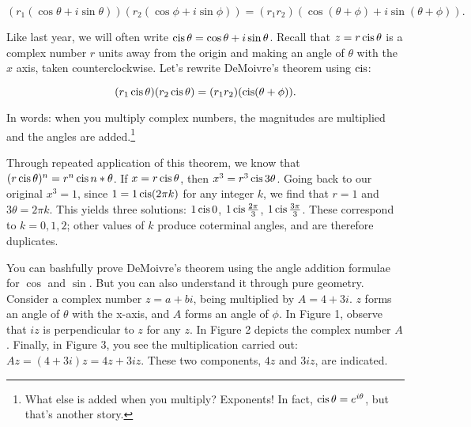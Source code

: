 \documentclass[../gatm.tex]{subfiles}
\begin{document}
$$(r_1 (\cos \theta + i \sin \theta)) (r_2 (\cos \phi + i \sin \phi)) = (r_1r_2) (\cos(\theta + \phi) + i \sin(\theta + \phi)).$$

\noindent Like last year, we will often write $\operatorname{cis} \theta = \cos \theta + i \sin \theta$. Recall that $z=r\operatorname{cis} \theta$ is a complex number $r$ units away from the origin and making an angle of $\theta$ with the $x$ axis, taken counterclockwise. Let’s rewrite DeMoivre’s theorem using $\operatorname{cis}$:

$$(r_1 \operatorname{cis} \theta)(r_2 \operatorname{cis} \theta) = (r_1r_2)(\operatorname{cis}(\theta + \phi)).$$

\noindent In words: when you multiply complex numbers, the magnitudes are multiplied and the angles are added.\footnote{What else is added when you multiply? Exponents! In fact, $\operatorname{cis} \theta = e^{i\theta}$, but that’s another story.}

Through repeated application of this theorem, we know that $(r \operatorname{cis} \theta) ^ n = r^n \operatorname{cis} n*\theta$. If $x = r \operatorname{cis} \theta$, then $x^3 = r^3 \operatorname{cis} 3\theta$. Going back to our original $x^3 = 1$, since $1 = 1 \operatorname{cis}(2\pi k)$ for any integer $k$, we find that $r = 1$ and $3\theta = 2\pi k$. This yields three solutions: $1 \operatorname{cis} 0$, $1 \operatorname{cis} \frac{2\pi}{3}$, $1 \operatorname{cis} \frac{3\pi}{3}$. These correspond to $k = 0, 1, 2$; other values of $k$ produce coterminal angles, and are therefore duplicates.

You can bashfully prove DeMoivre’s theorem using the angle addition formulae for $\cos$ and $\sin$. But you can also understand it through pure geometry. Consider a complex number $z = a + bi$, being multiplied by $A = 4 + 3i$. $z$ forms an angle of $\theta$ with the x-axis, and $A$ forms an angle of $\phi$. In Figure 1, observe that $iz$ is perpendicular to $z$ for any $z$. In Figure 2 depicts the complex number $A$. Finally, in Figure 3, you see the multiplication carried out: $Az = (4+3i)z = 4z + 3iz$. These two components, $4z$ and $3iz$, are indicated.
\end{document}
